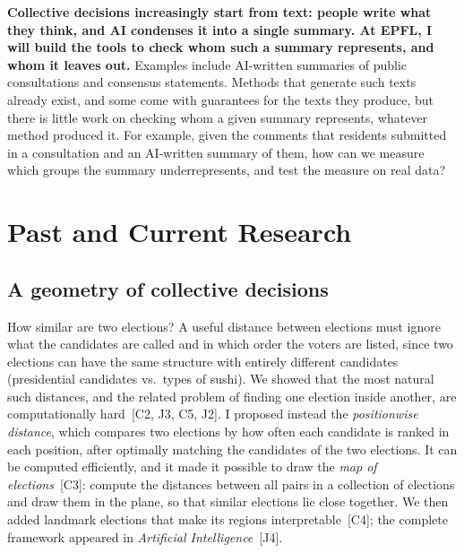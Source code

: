 \documentclass[11pt,a4paper]{article}
\newcommand{\pub}[1]{~[#1]}
\begin{document}
\textbf{Collective decisions increasingly start from text: people write what
they think, and AI condenses it into a single summary. At EPFL, I will build
the tools to check whom such a summary represents, and whom it leaves out.}
Examples include AI-written summaries of public consultations and consensus
statements. Methods that
generate such texts already exist, and some come with guarantees for the texts
they produce, but there is little work on checking whom a given summary
represents, whatever method produced it. For example, given the comments that residents submitted
in a consultation and an AI-written summary of them, how can we measure which
groups the summary underrepresents, and test the measure on real data?

\section{Past and Current Research}

\subsection{A geometry of collective decisions}
How similar are two elections? A useful distance between elections must
ignore what the candidates are called and in which
order the voters are listed, since two elections can have the same structure
with entirely different candidates (presidential candidates vs.\ types of
sushi). We showed that the most natural such distances, and the related
problem of finding one election inside another, are computationally
hard\pub{C2, J3, C5, J2}. I proposed instead the \emph{positionwise distance},
which compares two elections by how often each candidate is ranked in each
position, after optimally matching the candidates of the two elections. It
can be computed efficiently, and it made it possible to draw the \emph{map of
elections}\pub{C3}: compute the distances between all pairs in a collection
of elections and draw them in the plane, so that similar elections lie close
together. We then added landmark elections that make its regions
interpretable\pub{C4}; the complete framework appeared in \emph{Artificial
Intelligence}\pub{J4}.
\end{document}
